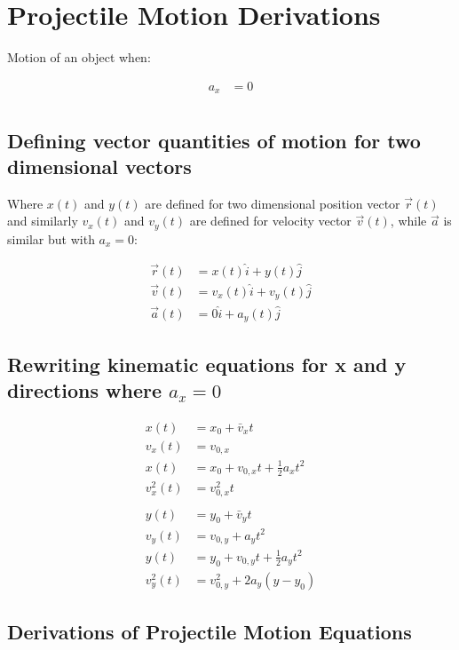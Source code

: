 \documentclass{article}
\numberwithin{equation}{section}
\begin{document}
 \section{Projectile Motion Derivations}
 Motion of an object when:
 
\[
  \begin{aligned}
    a_{x} &= 0 \\
  \end{aligned}
\]
 \subsection{Defining vector quantities of motion for two dimensional vectors}
  Where $x(t)$ and $y(t)$ are defined for two dimensional position vector
  $\vec{r}(t)$ and similarly $v_{x}(t)$ and $v_{y}(t)$ are defined for velocity
  vector $\vec{v}(t)$, while $\vec{a}$ is similar but with $a_x=0$:
  
 \[
   \begin{aligned}
    \vec{r}(t) &= x(t)\hat{i} + y(t)\hat{j} \\ 
    \vec{v}(t) &= v_x(t)\hat{i} + v_y(t)\hat{j}\\
    \vec{a}(t) &= 0\hat{i} + a_y(t)\hat{j}
   \end{aligned}
 \]
 \subsection{Rewriting kinematic equations for x and y directions where $a_x=0$}
\[
  \begin{aligned}
    x(t) &= x_{0} + \bar{v}_xt \\
    v_{x}(t) &= v_{0,x} \\
    x(t) &= x_{0} + v_{0,x} t + \frac{1}{2}a_xt^2 \\ 
    v_{x}^2(t) &=  v_{0,x}^2t\\
              &\ \\
    y(t) &= y_{0} + \bar{v}_yt \\
    v_{y}(t) &= v_{0,y} + a_{y}t^2 \\
    y(t) &= y_{0} + v_{0,y} t + \frac{1}{2}a_yt^2 \\
    v_{y}^2(t) &= v_{0,y}^2 + 2a_{y}(y-y_{0}) 
  \end{aligned}
\]
 
 \subsection{Derivations of Projectile Motion Equations}
\end{document}

